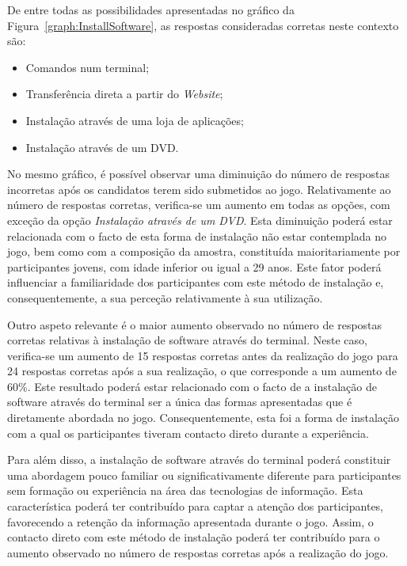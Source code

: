 De entre todas as possibilidades apresentadas no gráfico da Figura~\ref{graph:InstallSoftware}, as respostas consideradas corretas neste contexto são:
\begin{itemize}
\item Comandos num terminal;
\item Transferência direta a partir do \textit{Website};
\item Instalação através de uma loja de aplicações;
\item Instalação através de um DVD.
\end{itemize}

No mesmo gráfico, é possível observar uma diminuição do número de respostas incorretas após os candidatos terem sido submetidos ao jogo. Relativamente ao número de respostas corretas, verifica-se um aumento em todas as opções, com exceção da opção \textit{Instalação através de um DVD}. Esta diminuição poderá estar relacionada com o facto de esta forma de instalação não estar contemplada no jogo, bem como com a composição da amostra, constituída maioritariamente por participantes jovens, com idade inferior ou igual a 29 anos. Este fator poderá influenciar a familiaridade dos participantes com este método de instalação e, consequentemente, a sua perceção relativamente à sua utilização.

Outro aspeto relevante é o maior aumento observado no número de respostas corretas relativas à instalação de software através do terminal. Neste caso, verifica-se um aumento de 15 respostas corretas antes da realização do jogo para 24 respostas corretas após a sua realização, o que corresponde a um aumento de 60\%. Este resultado poderá estar relacionado com o facto de a instalação de software através do terminal ser a única das formas apresentadas que é diretamente abordada no jogo. Consequentemente, esta foi a forma de instalação com a qual os participantes tiveram contacto direto durante a experiência.

Para além disso, a instalação de software através do terminal poderá constituir uma abordagem pouco familiar ou significativamente diferente para participantes sem formação ou experiência na área das tecnologias de informação. Esta característica poderá ter contribuído para captar a atenção dos participantes, favorecendo a retenção da informação apresentada durante o jogo. Assim, o contacto direto com este método de instalação poderá ter contribuído para o aumento observado no número de respostas corretas após a realização do jogo.

